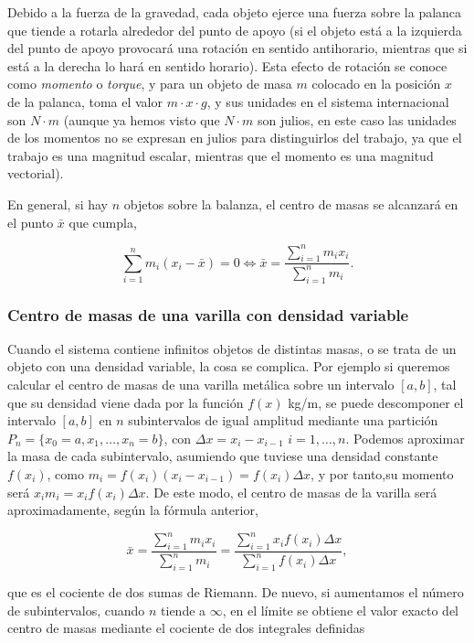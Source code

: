 \documentclass[
  a4paper,
]{scrreport}
\theoremstyle{plain}
\theoremstyle{definition}
\theoremstyle{plain}
\theoremstyle{plain}
\theoremstyle{definition}
\theoremstyle{definition}
\theoremstyle{remark}
\begin{document}
Debido a la fuerza de la gravedad, cada objeto ejerce una fuerza sobre
la palanca que tiende a rotarla alrededor del punto de apoyo (si el
objeto está a la izquierda del punto de apoyo provocará una rotación en
sentido antihorario, mientras que si está a la derecha lo hará en
sentido horario). Esta efecto de rotación se conoce como \emph{momento}
o \emph{torque}, y para un objeto de masa \(m\) colocado en la posición
\(x\) de la palanca, toma el valor \(m\cdot x\cdot g\), y sus unidades
en el sistema internacional son \(N\cdot m\) (aunque ya hemos visto que
\(N\cdot m\) son julios, en este caso las unidades de los momentos no se
expresan en julios para distinguirlos del trabajo, ya que el trabajo es
una magnitud escalar, mientras que el momento es una magnitud
vectorial).

En general, si hay \(n\) objetos sobre la balanza, el centro de masas se
alcanzará en el punto \(\bar x\) que cumpla,

\[
\sum_{i=1}^n m_i(x_i-\bar x) = 0 \Leftrightarrow \bar x = \frac{\sum_{i=1}^n m_ix_i}{\sum_{i=1}^n m_i}.
\]

\subsubsection{Centro de masas de una varilla con densidad
variable}\label{centro-de-masas-de-una-varilla-con-densidad-variable}

Cuando el sistema contiene infinitos objetos de distintas masas, o se
trata de un objeto con una densidad variable, la cosa se complica. Por
ejemplo si queremos calcular el centro de masas de una varilla metálica
sobre un intervalo \([a,b]\), tal que su densidad viene dada por la
función \(f(x)\) kg/m, se puede descomponer el intervalo \([a,b]\) en
\(n\) subintervalos de igual amplitud mediante una partición
\(P_n=\{x_0=a, x_1, \ldots, x_n=b\}\), con \(\Delta x=x_i-x_{i-1}\)
\(i=1, \ldots, n\). Podemos aproximar la masa de cada subintervalo,
asumiendo que tuviese una densidad constante \(f(x_i)\), como
\(m_i = f(x_i)(x_i-x_{i-1}) = f(x_i) \Delta x\), y por tanto,su momento
será \(x_im_i = x_i f(x_i)\Delta x\). De este modo, el centro de masas
de la varilla será aproximadamente, según la fórmula anterior,

\[
\bar x = \frac{\sum_{i=1}^n m_ix_i}{\sum_{i=1}^n m_i} = \frac{\sum_{i=1}^n x_if(x_i)\Delta x}{\sum_{i=1}^n f(x_i)\Delta x},
\]

que es el cociente de dos sumas de Riemann. De nuevo, si aumentamos el
número de subintervalos, cuando \(n\) tiende a \(\infty\), en el límite
se obtiene el valor exacto del centro de masas mediante el cociente de
dos integrales definidas
\end{document}
